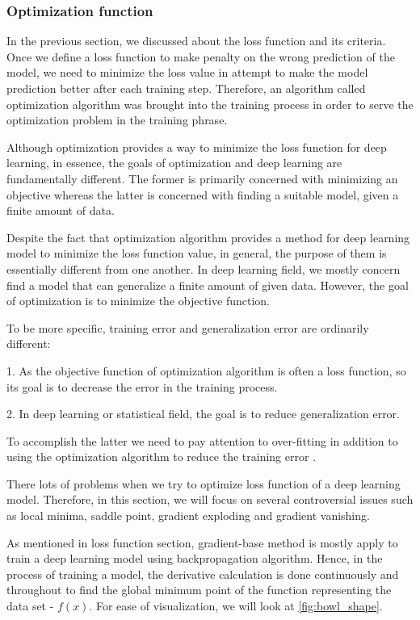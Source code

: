 \subsubsection{Optimization function}
\label{subsubsection:optimfunc}
\noindent

	In the previous section, we discussed about the loss function and its criteria. Once we define a loss function to make penalty on the wrong prediction of the model, we need to minimize the loss value in attempt to make the model prediction better after each training step. Therefore, an algorithm called optimization algorithm was brought into the training process in order to serve the optimization problem in the training phrase.
	
	Although optimization provides a way to minimize the loss function for deep learning, in essence, the goals of optimization and deep learning are fundamentally different. The former is primarily concerned with minimizing an objective whereas the latter is concerned with finding a suitable model, given a finite amount of data.
	
	Despite the fact that optimization algorithm provides a method for deep learning model to minimize the loss function value, in general, the purpose of them is essentially different from one another. In deep learning field, we mostly concern find a model that can generalize a finite amount of given data. However, the goal of optimization is to minimize the objective function.
	
	To be more specific, training error and generalization error are ordinarily different:

	1. As the objective function of optimization algorithm is often a loss function, so its goal is to decrease the error in the training process.

	2. In deep learning or statistical field, the goal is to reduce generalization error.

	To accomplish the latter we need to pay attention to over-fitting in addition to using the optimization algorithm to reduce the training error \cite{dive2dl}.
	
	There lots of problems when we try to optimize loss function of a deep learning model. Therefore, in this section, we will focus on several controversial issues such as local minima, saddle point, gradient exploding and gradient vanishing.
	
	As mentioned in loss function section, gradient-base method is mostly apply to train a deep learning model using backpropagation algorithm. Hence, in the process of training a model, the derivative calculation is done continuously and throughout to find the global minimum point of the function representing the data set - $ f (x) $. For ease of visualization, we will look at \ref{fig:bowl_shape}.
	
